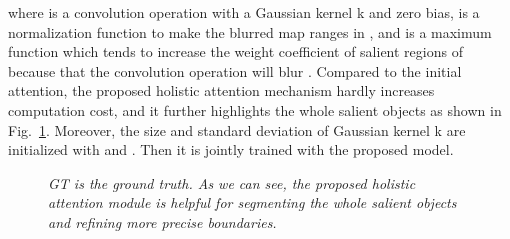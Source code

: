 \documentclass[10pt,twocolumn,letterpaper]{article}
\begin{document}
where  is a convolution operation with a Gaussian kernel k and zero bias,  is a normalization function to make the blurred map ranges in , and  is a maximum function which tends to increase the weight coefficient of salient regions of  because that the convolution operation will blur . Compared to the initial attention, the proposed holistic attention mechanism hardly increases computation cost, and it further highlights the whole salient objects as shown in Fig.~\ref{SoftAttentoinExamples}. Moreover, the size and standard deviation of Gaussian kernel k are initialized with  and . Then it is jointly trained with the proposed model.

\begin{figure}[t]
\centering
{}
\hspace{-1.2ex}
\hspace{-1.2ex}
\hspace{-1.2ex}
\caption{\emph{GT is the ground truth. As we can see, the proposed holistic attention module is helpful for segmenting the whole salient objects and refining more precise boundaries.}}
\label{SoftAttentoinExamples}
\end{figure}
\end{document}

